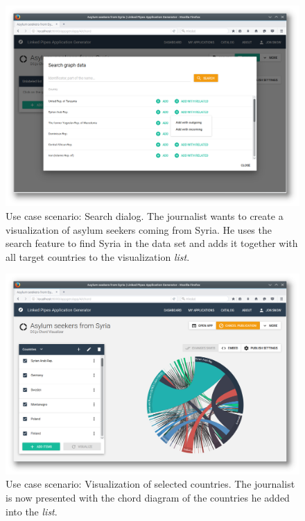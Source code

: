 \begin{figure}
	\centering
	\includegraphics[width=145mm]{img/05_scenario_05_search_graph}
	\caption{Use case scenario: Search dialog. The journalist wants to create a visualization of asylum seekers coming from Syria. He uses the search feature to find Syria in the data set and adds it together with all target countries to the visualization \emph{list}.}
	\label{fig:scenario-05-search-graph}
\end{figure}

\begin{figure}
	\centering
	\includegraphics[width=145mm]{img/05_scenario_06_ready_application}
	\caption{Use case scenario: Visualization of selected countries. The journalist is now presented with the chord diagram of the countries he added into the \emph{list}.}
	\label{fig:scenario-06-ready application}
\end{figure}

